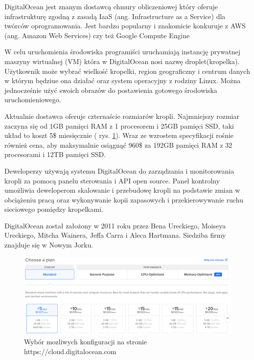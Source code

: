 

DigitalOcean jest znanym dostawcą chmury obliczeniowej który oferuje infrastrukturę zgodną z zasadą IaaS (ang. Infrastructure as a Service) dla twórców oprogramowania. Jest bardzo popularny i znakomicie konkuruje z AWS (ang. Amazon Web Services) czy też Google Compute Engine

W celu uruchomienia środowiska programiści uruchamiają instancję prywatnej maszyny wirtualnej (VM) która w DigitalOcean nosi nazwę droplet(kropelka). Użytkownik może wybrać wielkość kropelki, region geograficzny i centrum danych w którym będziue ona działać oraz system operacyjny z rodziny Linux.
Można jednocześnie użyć swoich obrazów do postawienia gotowego środowiska uruchomieniowego.

Aktualnie dostawca oferuje czternaście rozmiarów kropli. Najmniejszy rozmiar zaczyna się od 1GB pamięci RAM z 1 procesorem i 25GB pamięci SSD, taki układ to koszt 5\$ miesięcznie ( rys. \ref{fig:digitalocean}). Wraz ze wzrostem specyfikacji rośnie również cena, aby maksymalnie osiągnąć 960\$ za 192GB pamięci RAM z 32 procesorami i 12TB pamięci SSD.

Deweloperzy używają systemu DigitalOcean do zarządzania i monitorowania kropli za pomocą panelu sterowania i API open source. Panel kontrolny umożliwia deweloperom skalowanie i przebudowę kropli na podstawie zmian w obciążeniu pracą oraz wykonywanie kopii zapasowych i przekierowywanie ruchu sieciowego pomiędzy kropelkami.

DigitalOcean został założony w 2011 roku przez Bena Ureckiego, Moiseya Ureckiego, Mitcha Wainera, Jeffa Carra i Aleca Hartmana. Siedziba firmy znajduje się w Nowym Jorku.


\begin{figure}[H]
    \centering
    \includegraphics[width=6in]{images/digitalocean.png}
    \caption{Wybór mozliwych konfiguracji na stronie https://cloud.digitalocean.com \label{fig:digitalocean}}
\end{figure}